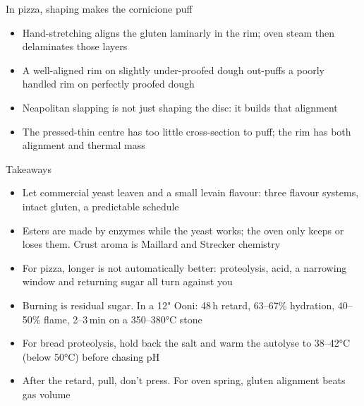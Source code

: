 \documentclass[aspectratio=169,11pt]{beamer}
\begin{document}
\begin{frame}{In pizza, shaping makes the cornicione puff}
  \small
  \begin{itemize}\setlength{\itemsep}{0.35em}
    \item Hand-stretching aligns the gluten laminarly in the rim; oven steam
      then delaminates those layers
    \item A well-aligned rim on slightly under-proofed dough out-puffs a
      poorly handled rim on perfectly proofed dough
    \item Neapolitan slapping is not just shaping the disc: it builds that
      alignment
    \item The pressed-thin centre has too little cross-section to puff; the
      rim has both alignment and thermal mass
  \end{itemize}
\end{frame}


\begin{frame}{Takeaways}
  \small
  \begin{itemize}\setlength{\itemsep}{0.25em}
    \item Let commercial yeast leaven and a small levain flavour: three
      flavour systems, intact gluten, a predictable schedule
    \item Esters are made by enzymes while the yeast works; the oven only
      keeps or loses them. Crust aroma is Maillard and Strecker chemistry
    \item For pizza, longer is not automatically better: proteolysis, acid,
      a narrowing window and returning sugar all turn against you
    \item Burning is residual sugar. In a 12" Ooni: 48\,h retard, 63--67\%
      hydration, 40--50\% flame, 2--3\,min on a 350--380°C stone
    \item For bread proteolysis, hold back the salt and warm the autolyse to
      38--42°C (below 50°C) before chasing pH
    \item After the retard, pull, don't press. For oven spring, gluten
      alignment beats gas volume
  \end{itemize}
\end{frame}
\end{document}
